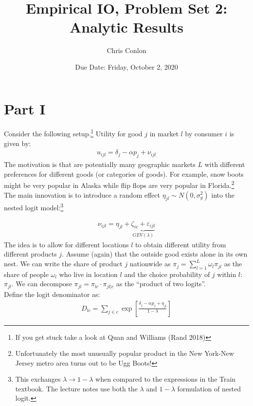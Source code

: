 \documentclass[12pt]{article}
\begin{document}
\title{Empirical IO, Problem Set 2: \\
Analytic Results}
\author{Chris Conlon}
\date{Due Date: Friday, October 2, 2020}
\maketitle

\section*{\normalsize Part I}
Consider the following setup.\footnote{If you get stuck take a look at Quan and Williams (Rand 2018)} Utility for good $j$ in market $l$ by consumer $i$ is given by:
\begin{eqnarray*}
u_{ijl} = \delta_j - \alpha p_j + \nu_{ijl}
\end{eqnarray*}
The motivation is that are potentially many geographic markets $L$ with different preferences for different goods (or categories of goods). For example, snow boots might be very popular in Alaska while flip flops are very popular in Florida.\footnote{Unfortunately the most unusually popular product in the New York-New Jersey metro area turns out to be Ugg Boots!}\\

\noindent The main innovation is to introduce a random effect $\eta_{jl} \sim N(0,\sigma_g^2)$ into the nested logit model:\footnote{This exchanges $\lambda \rightarrow 1-\lambda$ when compared to the expressions in the Train textbook. The lecture notes use both the $\lambda$ and $1-\lambda$ formulation of nested logit.}

\begin{eqnarray*}
\nu_{ijl} = \eta_{jl}+ \underbrace{\zeta_{ic} + \varepsilon_{ijl}}_{GEV(\lambda)}
\end{eqnarray*}
The idea is to allow for different locations $l$ to obtain different utility from different products $j$. Assume (again) that the outside good exists alone in its own nest. We can write the share of product $j$ nationwide as $\pi_j = \sum_{l=1}^L \omega_l \pi_{jl}$ as the share of people $\omega_l$ who live in location $l$ and the choice probability of $j$ within $l$: $\pi_{jl}$. We can decompose $\pi_{jl} =  \pi_{lc} \cdot \pi_{jl|c}$ as the ``product of two logits''.\\

Define the logit denominator as:
\begin{eqnarray*}
D_{lc} = \sum_{j \in c} \exp \left[\frac{\delta_j  -\alpha p_j+ \eta_{jl}}{1-\lambda}\right]
\end{eqnarray*}
\end{document}
